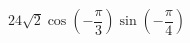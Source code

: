 \begin{ex}[type=type=expression]
	\begin{condition}
		\( 24\sqrt{2}\cos\left( -\dfrac{\pi}{3} \right)\sin\left( -\dfrac{\pi}{4} \right)\)
	\end{condition}
\end{ex}